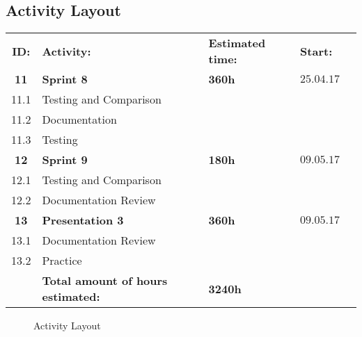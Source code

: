 \begin{center}
\section*{\textbf{Activity Layout}}
\begin{tabular}{cllll}
\rowcolor{cadetgrey}
\textbf{ID:}    &\textbf{Activity:} 	 &\textbf{Estimated time:}    &\textbf{Start:}  \\ %

\rowcolor{gainsboro}
\textbf{11} & \textbf{Sprint 8}     & \textbf{360h}    & $25.04.17$ \\
11.1     & Testing and Comparison              &  &  \\\rowcolor{gainsboro}
11.2     & Documentation &  &  \\
11.3     & Testing & &  \\ 
\rowcolor{gainsboro}
\textbf{12} & \textbf{Sprint 9}     & \textbf{180h}     & $09.05.17$ \\
12.1     & Testing and Comparison &  &  \\\rowcolor{gainsboro}
12.2     & Documentation Review &  & \\
\textbf{13} & \textbf{Presentation 3}     & \textbf{360h}     & $09.05.17$ \\
\rowcolor{gainsboro}
13.1     & Documentation Review &  & \\
13.2     & Practice & & \\
\rowcolor{gainsboro}
         & \textbf{Total amount of hours estimated:} & \textbf{3240h} & 
\end{tabular}                                                               
\end{center}
\begin{figure}[h]
        \centering
          \centering
            \caption{Activity Layout}
            \label{list}
\end{figure}